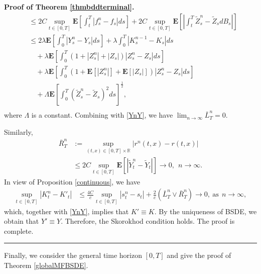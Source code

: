 \documentclass[10pt]{article}%
\numberwithin{equation}{section}
\newenvironment{proof}[1][Proof]{\noindent \textbf{#1.} }{\  \rule{0.5em}{0.5em}}
\begin{document}
\begin{proof}[Proof of Theorem \ref{thmbddterminal}]
$$\begin{aligned}
    &\leq 2C\sup_{t\in[0,T]}\mathbf{E}\left[\int_{t}^{T}\left|f_s^n-f_s\right|ds\right]+2C\sup_{t\in[0,T]}\mathbf{E}\left[\left|\int_{t}^{T}\tilde{Z}^n_s-\tilde{Z}_sdB_s\right|\right]\\
    &\leq 2\lambda \mathbf{E}\left[\int_{0}^{T}\left|Y^n_s-Y_s\right|ds\right]+\lambda \int_{0}^{T}\left|K^{n-1}_s-K_s\right|ds \\
    &\quad + \lambda \mathbf{E}\left[\int_{0}^{T}\left(1+\left|Z^n_s\right|+\left|Z_s\right|\right)\left|Z^n_s-Z_s\right|ds\right]\\
&\quad+\lambda \mathbf{E}\left[\int_{0}^{T}\left(1+\mathbf{E}\left[\left|Z^n_s\right|\right]+\mathbf{E}\left[\left|Z_s\right|\right]\right)\left|Z^n_s-Z_s\right|ds\right]\\
&\quad+\Lambda \mathbf{E}\left[\int_{0}^{T}\left(\tilde{Z}^n_s-\tilde{Z}_s\right)^2ds\right]^{\frac{1}{2}},\\ 
\end{aligned}
$$
where $\Lambda$ is a constant. Combining with \eqref{YnY}, we have $\lim_{n\rightarrow \infty}\bar{L}^n_{T}=0.$ 

Similarly, 
$$
\begin{aligned}
	\bar{R}^n_{T}&:= \sup_{(t,x)\in[0,T]\times \mathbb{R}}\left|r^n(t,x)-r(t,x)\right|\\
	&\leq 2C\sup_{t\in[0,T]}\mathbf{E}\left[\left|\widetilde{Y}^n_t-\widetilde{Y}_t\right|\right]\rightarrow 0, \ \ n \rightarrow \infty.
\end{aligned}
$$
 In view of Proposition \ref{continuous}, we have 
$$
\begin{aligned}
 \sup_{t\in[0,T]}\left|K_t^{n}-K'_t\right|
 &\leq \frac{4C}{c}\sup_{t\in[0,T]}\left|s_t^{n}-s_t\right|+\frac{2}{c}\left(\bar{L}^n_{T}\vee\bar{R}^n_{T}\right)\to 0,\ \text{as} \ \  n\to \infty , 
\end{aligned}
$$
which, together with \eqref{YnY}, implies that $ K'\equiv K$. By the uniqueness of BSDE, we obtain that $Y'\equiv Y$. Therefore, the Skorokhod condition holds. The proof is complete.    
\end{proof}

Finally, we consider the general time horizon $[0,T]$ and give the proof of Theorem \ref{globalMFBSDE}.
\end{document}
